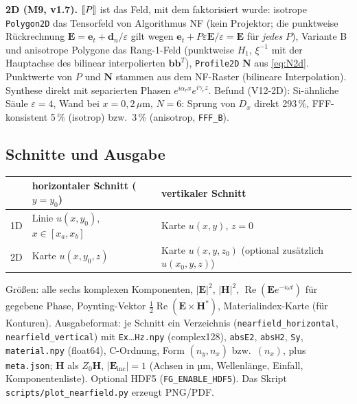 \textbf{2D (M9, v1.7).} $[\![P]\!]$ ist das Feld, mit dem faktorisiert wurde: isotrope \texttt{Polygon2D} das
Tensorfeld von Algorithmus NF (kein Projektor; die punktweise Rückrechnung $\mathbf E=\mathbf e_t+\mathbf d_n/\varepsilon$
gilt wegen $\mathbf e_t+P\varepsilon\mathbf E/\varepsilon=\mathbf E$ für \emph{jedes} $P$), Variante B und anisotrope Polygone das
Rang-1-Feld (punktweise $H_1$, $\xi^{-1}$ mit der Hauptachse des bilinear interpolierten $\mathbf b\mathbf b^T$),
\texttt{Profile2D} $\mathbf N$ aus \eqref{eq:N2d}. Punktwerte von $P$ und $\mathbf N$ stammen aus dem NF-Raster
(bilineare Interpolation). Synthese direkt mit separierten Phasen $e^{i\alpha_rx}e^{i\gamma_rz}$.
Befund (V12-2D): Si-ähnliche Säule $\varepsilon=4$, Wand bei $x=0{,}2\,\mu$m, $N=6$: Sprung von $D_x$ direkt
293\,\%, FFF-konsistent 5\,\% (isotrop) bzw.\ 3\,\% (anisotrop, \verb|FFF_B|).

\subsection{Schnitte und Ausgabe}
\begin{center}
\small
\begin{tabular}{lll}
\toprule
& horizontaler Schnitt ($y=y_0$) & vertikaler Schnitt \\
\midrule
1D & Linie $u(x,y_0)$, $x\in[x_a,x_b]$ & Karte $u(x,y)$, $z=0$ \\
2D & Karte $u(x,y_0,z)$ & Karte $u(x,y,z_0)$ (optional zusätzlich $u(x_0,y,z)$) \\
\bottomrule
\end{tabular}
\end{center}
Größen: alle sechs komplexen Komponenten, $|\mathbf E|^2$, $|\mathbf H|^2$, $\operatorname{Re}(\mathbf Ee^{-i\omega t})$ für
gegebene Phase, Poynting-Vektor $\tfrac12\operatorname{Re}(\mathbf E\times\mathbf H^*)$, Materialindex-Karte (für Konturen).
Ausgabeformat: je Schnitt ein Verzeichnis (\verb|nearfield_horizontal|, \verb|nearfield_vertical|) mit
\verb|Ex|\dots\verb|Hz.npy| (complex128), \verb|absE2|, \verb|absH2|, \verb|Sy|, \verb|material.npy| (float64),
C-Ordnung, Form $(n_y,n_x)$ bzw.\ $(n_x)$, plus \verb|meta.json|; $\mathbf H$ als $Z_0\mathbf H$, $|\mathbf E_{\text{inc}}|=1$ (Achsen in µm, Wellenlänge,
Einfall, Komponentenliste). Optional HDF5 (\verb|FG_ENABLE_HDF5|). Das Skript
\verb|scripts/plot_nearfield.py| erzeugt PNG/PDF.
